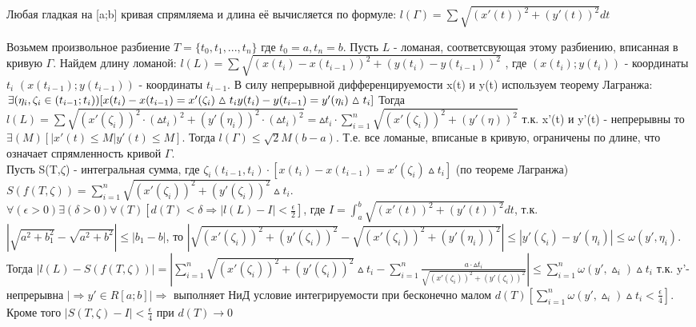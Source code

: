 \begin{teorema}
	Любая гладкая на [a;b] кривая спрямляема и длина её вычисляется по формуле:
	$l(\varGamma)= \sum \sqrt{(x'(t))^2+(y'(t))^2} dt$
\end{teorema}

\dokvo
Возьмем произвольное разбиение $T=\{t_0,t_1,...,t_n\}$ где $t_0=a, t_n=b$. Пусть $L$ - ломаная, соответсвующая этому разбиению, вписанная в кривую $\varGamma$.
Найдем длину ломаной:
$l(L)=\sum \sqrt{(x(t_i)-x(t_{i-1}))^2+(y(t_i)-y(t_{i-1}))^2}$ , где $(x(t_i);y(t_i))$ - координаты $t_i$
 $(x(t_{i-1});y(t_{i-1}))$ - координаты $t_{i-1}$.
 В силу непрерывной дифференцируемости x(t) и y(t) используем теорему Лагранжа:
$\exists (\eta_i , \zeta_i \in(t_{i-1};t_i))[x(t_i)-x(t_{i-1})=x'(\zeta_i)\vartriangle t_i \\
y(t_i)-y(t_{i-1})=y'(\eta_i) \vartriangle t_i]$
Тогда $l(L)= \sum \sqrt{(x'(\zeta_i))^2 \cdot (\vartriangle t_i)^2 + (y'(\eta_i))^2 \cdot (\vartriangle t_i)^2} = \vartriangle t_i \cdot \sum_{i=1}^{n} \sqrt{(x'(\zeta_i))^2+(y'(\eta))^2}$ т.к. x'(t) и y'(t) - непрерывны то $\exists(M)[|x'(t)\leqslant M|y'(t)\leqslant M]$.
Тогда $l(\varGamma) \leqslant \sqrt{2} M(b-a)$. Т.е. все ломаные, вписаные в кривую, ограничены по длине, что означает спрямленность кривой $\varGamma$.
\\
Пусть S(T,$\zeta$) - интегральная сумма, где $\zeta_i(t_{i-1},t_i) \cdot [x(t_i)-x(t_{i-1})=x'(\zeta_i)\vartriangle t_i]$ (по теореме Лагранжа) $S(f(T,\zeta)) = \sum_{i=1}^{n} \sqrt{(x'(\zeta_i))^2+(y'(\zeta_i))^2} \vartriangle t_i$.
\\
$\forall (\epsilon > 0) \exists (\delta>0) \forall(T)[d(T)<\delta \Rightarrow |l(L)-I|<\frac{\epsilon}{2}]$, где $I=\int_{a}^{b} \sqrt{(x'(t))^2+(y'(t))^2}dt$, т.к. $|\sqrt{a^2+b_1^2}-\sqrt{a^2+b^2}|\leqslant|b_1 - b|$, то $|\sqrt{(x'(\zeta_i))^2+(y'(\zeta_i))^2}-\sqrt{(x'(\zeta_i))^2+(y'(\eta_i))^2}| \leqslant |y'(\zeta_i) - y'(\eta_i)|\leqslant \omega(y',\eta_i)$.
\\
Тогда $|l(L)-S(f(T,\zeta))|=|\sum_{i=1}^{n}\sqrt{(x'(\zeta_i))^2+(y'(\zeta_i))^2} \vartriangle t_i - \sum_{i=1}^{n}\frac{a \cdot \vartriangle t_i}{\sqrt{(x'(\zeta_i))^2+(y'(\zeta_i))^2}}| \leqslant \sum_{i=1}^{n} \omega(y',\vartriangle_i)\vartriangle t_i$ т.к. y'-непрерывна $|\Rightarrow y'\in R[a;b]|\Rightarrow$ выполняет НиД условие интегрируемости при бесконечно малом $d(T)[\sum_{i=1}^{n}\omega(y',\vartriangle_i)\vartriangle t_i < \frac{\epsilon}{4}]$.
\\Кроме того $|S(T,\zeta)-I|<\frac{\epsilon}{4}$ при $d(T)\rightarrow 0$
